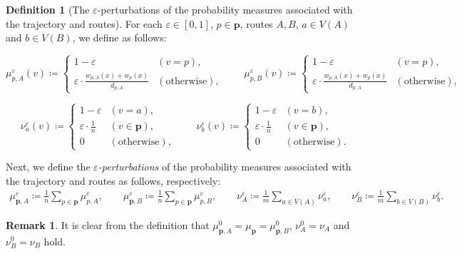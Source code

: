 \documentclass{article}
\numberwithin{equation}{section}
\theoremstyle{definition}
\newtheorem{definition}{Definition}[section]
\newtheorem{remark}[remark]{Remark}
\newcommand{\eps}{\varepsilon} %
\def\:={\coloneqq} %
\begin{document}
\begin{definition}[The $\eps$-perturbations of the probability measures associated with the trajectory and routes]
For each $\eps\in[0,1]$, $p\in\mathbf{p}$, routes $A,B$, $a\in V(A)$ and $b\in V(B)$, we define as follows:
\begin{center} \vspace{-6mm}
\[ \mu_{p,A}^\eps(v) \:= \left.
\begin{cases}
1-\eps & (v=p),   \\
\eps\cdot\frac{w_{p,A}(x)+w_p(x)}{d_{p,A}} & (\text{otherwise}), 
\end{cases}
\right.
\qquad
\mu_{p,B}^\eps(v) \:=
\begin{cases}
1-\eps & (v=p),   \\
\eps\cdot\frac{w_{p,A}(x)+w_p(x)}{d_{p,A}} & (\text{otherwise}), 
\end{cases}\]
\end{center} 
\begin{center} \vspace{-4mm}
\[ \nu_a^\eps(v) \:= \left.
\begin{cases}
1-\eps & (v=a),   \\
\eps\cdot\frac{1}{n} & (v\in\mathbf{p}),   \\
0 & (\text{otherwise}), 
\end{cases}
\right.
\qquad
\nu_b^\eps(v) \:=
\begin{cases}
1-\eps & (v=b),   \\
\eps\cdot\frac{1}{n} & (v\in\mathbf{p}),   \\
0 & (\text{otherwise}).
\end{cases}\]
\end{center} 
Next, we define the \emph{$\eps$-perturbations} of the probability measures associated with the trajectory and routes as follows, respectively:
\begin{align*}
    \mu_{\mathbf{p},A}^\eps\:=\frac{1}{n}\sum_{p\in\mathbf{p}}\mu_{p,A}^\eps, \qquad
    \mu_{\mathbf{p},B}^\eps\:=\frac{1}{n}\sum_{p\in\mathbf{p}}\mu_{p,B}^\eps, \qquad
    \nu_A^\eps\:=\frac{1}{m}\sum_{a\in V(A)}\nu_a^\eps, \qquad
    \nu_B^\eps\:=\frac{1}{m}\sum_{b\in V(B)}\nu_b^\eps.
\end{align*}
\end{definition}

\begin{remark}
It is clear from the definition that $\mu_{\mathbf{p},A}^0=\mu_\mathbf{p}=\mu_{\mathbf{p},B}^0$, $\nu_A^0=\nu_A$ and $\nu_B^0=\nu_B$ hold.
\end{remark}
\end{document}
